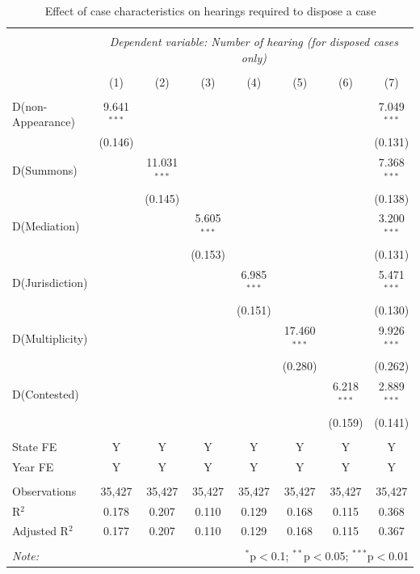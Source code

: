 \documentclass[12pt,a4paper]{article}
\begin{document}
\begin{table}[!ht]
\caption{Effect of case characteristics on hearings required to dispose a case} \label{tab:hearings_regression}
\footnotesize
\centering
\begin{tabular}{lccccccc}
\\[-1.8ex]
\hline \\[-1.8ex]
& \multicolumn{7}{c}{\textit{Dependent variable: Number of hearing (for disposed cases only)}} \\
\cline{2-8}
\\[-1.8ex] & (1) & (2) & (3) & (4) & (5) & (6) & (7)\\
\hline \\[-1.8ex]
D(non-Appearance) & 9.641$^{***}$ & & & & & & 7.049$^{***}$ \\
& (0.146) & & & & & & (0.131) \\
D(Summons) & & 11.031$^{***}$ & & & & & 7.368$^{***}$ \\
& & (0.145) & & & & & (0.138) \\
D(Mediation) & & & 5.605$^{***}$ & & & & 3.200$^{***}$ \\
& & & (0.153) & & & & (0.131) \\
D(Jurisdiction) & & & & 6.985$^{***}$ & & & 5.471$^{***}$ \\
& & & & (0.151) & & & (0.130) \\
D(Multiplicity) & & & & & 17.460$^{***}$ & & 9.926$^{***}$ \\
& & & & & (0.280) & & (0.262) \\
D(Contested) & & & & & & 6.218$^{***}$ & 2.889$^{***}$ \\
& & & & & & (0.159) & (0.141) \\
\hline \\[-1.8ex]
State FE & Y & Y & Y & Y & Y & Y & Y \\
Year FE & Y & Y & Y & Y & Y & Y & Y \\
\hline \\[-1.8ex]
Observations & 35,427 & 35,427 & 35,427 & 35,427 & 35,427 & 35,427 & 35,427 \\
R$^{2}$ & 0.178 & 0.207 & 0.110 & 0.129 & 0.168 & 0.115 & 0.368 \\
Adjusted R$^{2}$ & 0.177 & 0.207 & 0.110 & 0.129 & 0.168 & 0.115 & 0.367 \\
\hline \\[-1.8ex]
\textit{Note:} & \multicolumn{7}{r}{$^{*}$p$<$0.1; $^{**}$p$<$0.05; $^{***}$p$<$0.01} \\
\end{tabular}
\end{table}
\end{document}
